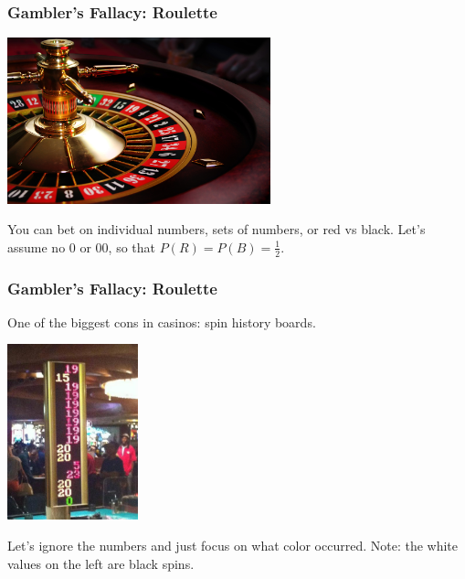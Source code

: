 \documentclass[handout]{beamer}
\newcommand{\blue}[1]{\textcolor{blue2}{#1}}
\begin{document}
\begin{frame}
\frametitle{Gambler's Fallacy: Roulette}
\begin{center}
   \includegraphics[width=3in]{figure/Roulette_wheel.jpg} 
\end{center}

You can bet on individual numbers, sets of numbers, or \blue{red vs black}.  Let's assume no 0 or 00, so that $P(R) = P(B) = \frac{1}{2}$.  

\end{frame}


\begin{frame}
\frametitle{Gambler's Fallacy: Roulette}
One of the biggest cons in casinos: \blue{spin history boards}.
\begin{center}
   \includegraphics[height=2in]{figure/roulette.jpg} 
\end{center}
Let's ignore the numbers and just focus on what color occurred. Note: the white values on the left are \blue{black} spins.
\end{frame}
\end{document}
